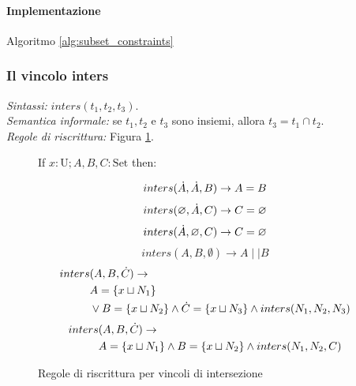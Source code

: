 \documentclass[12pt,a4paper,openright]{book} %
\begin{document}
\paragraph{Implementazione}
Algoritmo \ref{alg:subset_constraints}

\subsubsection{Il vincolo inters}

\textit{Sintassi:} $inters(t_1,t_2,t_3)$.\\
\noindent\textit{Semantica informale:} se $t_1, t_2$ e $t_3$ sono insiemi, allora $t_3 = t_1 \cap t_2$.\\
\noindent\textit{Regole di riscrittura:} Figura \ref{fig:intersect_constraints}.

\begin{figure}
	\begin{tcolorbox}[colframe=black, colback=white, sharp corners]
		\setcounter{equation}{7}
		\renewcommand{\theequation}{$\cup$\textsubscript{\arabic{equation}}}
		
		If $x: \text{U}; A, B, C: \text{Set}$ then:
		
		\begin{equation}
		inters(\dot{A}, \dot{A}, B) \to A = B
		\end{equation}
		\begin{equation}
		inters(\varnothing, \dot{A}, C) \to C = \varnothing
		\end{equation}
		\begin{equation}
		inters(\dot{A}, \varnothing, C) \to C = \varnothing
		\end{equation}
		\begin{equation}
		inters(A,B,\emptyset) \to A \mid\mid B
		\end{equation}
		\begin{equation}
		\begin{split}
		inters & (A,B,\dot{C}) \to \\
		& A = \{ x \sqcup N_1 \} \\
		& \lor B = \{ x \sqcup N_2 \} \land \dot{C} = \{ x \sqcup N_3 \} \land inters(N_1, N_2, N_3)
		\end{split}
		\end{equation}
		\begin{equation}
		\begin{split}
		inters & (A,B,\dot{C}) \to \\
		& A = \{ x \sqcup N_1 \} \land B = \{ x \sqcup N_2 \} \land inters(N_1, N_2, C)
		\end{split}
		\end{equation}
		
	\end{tcolorbox}
	
	\caption{Regole di riscrittura per vincoli di intersezione}
	\label{fig:intersect_constraints}
\end{figure}
\end{document}
